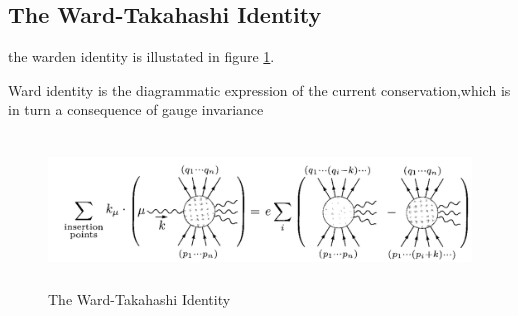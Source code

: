 \subsection{The Ward-Takahashi Identity}
the warden identity is illustated in figure \ref{fig:warden}.\par Ward identity is the diagrammatic expression of the current conservation,which is in turn a consequence of gauge invariance\par
\begin{figure}
\begin{center}
\includegraphics[height=4cm]{figures/warden}
\caption{The Ward-Takahashi Identity}
\label{fig:warden}
\end{center}
\end{figure}

